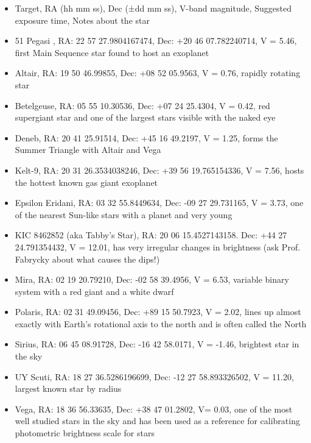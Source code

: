 \begin{itemize}

	\item Target, RA (hh mm ss), Dec (±dd mm ss), V-band magnitude, Suggested exposure time, Notes about the star
	
	\item 51 Pegasi , RA: 22 57 27.9804167474, Dec: +20 46 07.782240714, V = 5.46, first Main Sequence star found to host an exoplanet
	
	\item Altair, RA: 19 50 46.99855, Dec: +08 52 05.9563, V = 0.76, rapidly rotating star
	
	\item Betelgeuse, RA: 05 55 10.30536, Dec: +07 24 25.4304, V = 0.42, red supergiant star and one of the largest stars visible with the naked eye

	\item Deneb, RA: 20 41 25.91514, Dec: +45 16 49.2197, V = 1.25, forms the Summer Triangle with Altair and Vega 
	
	\item Kelt-9, RA: 20 31 26.3534038246, Dec: +39 56 19.765154336, V = 7.56, hosts the hottest known gas giant exoplanet
	
	\item Epsilon Eridani, RA: 03 32 55.8449634, Dec: -09 27 29.731165, V = 3.73, one of the nearest Sun-like stars with a planet and very young
	
	\item KIC 8462852 (aka Tabby's Star), RA: 20 06 15.4527143158. Dec: +44 27 24.791354432, V = 12.01, has very irregular changes in brightness (ask Prof. Fabrycky about what causes the dips!)
	
	\item Mira, RA: 02 19 20.79210, Dec: -02 58 39.4956, V = 6.53, variable binary system with a red giant and a white dwarf
	
	\item Polaris, RA: 02 31 49.09456,  Dec: +89 15 50.7923, V = 2.02, lines up almost exactly with Earth's rotational axis to the north and is often called the North
	
	\item Sirius, RA: 06 45 08.91728, Dec: -16 42 58.0171, V = -1.46, brightest star in the sky
	
	\item UY Scuti, RA: 18 27 36.5286196699, Dec: -12 27 58.893326502, V = 11.20, largest known star by radius
	
	\item Vega, RA: 18 36 56.33635, Dec: +38 47 01.2802, V= 0.03, one of the most well studied stars in the sky and has been used as a reference for calibrating photometric brightness scale for stars

\end{itemize}

